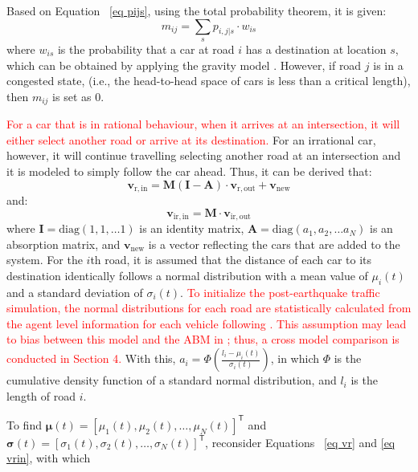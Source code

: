 \documentclass[review,11pt,nonatbib]{elsarticle}
\begin{document}
Based on Equation ~\eqref{eq pijs}, using the total probability theorem, it is given:
\begin{equation}\label{eq mij}
m_{ij}=\sum_{s} p_{i,j|s}\cdot w_{is}
\end{equation}
where $w_{is}$ is the probability that a car at road $i$ has a destination at location $s$, which can be obtained by applying the gravity model \citep{moriarty2007modeling,chang2012post}. However, if road $j$ is in a congested state, (i.e., the head-to-head space of cars is less than a critical length), then $m_{ij}$ is set as 0.
\par \textcolor{red}{For a car that is in rational behaviour, when it arrives at an intersection, it will either select another road or arrive at its destination.} For an irrational car, however, it will continue travelling selecting another road at an intersection and it is modeled to simply follow the car ahead. Thus, it can be derived that:
\begin{equation}\label{eq vrin}
\mathbf{v}_{\mathrm{r,in}} = \mathbf{M}(\mathbf{I}-\mathbf{A})\cdot \mathbf{v}_{\mathrm{r,out}} + \mathbf{v}_{\mathrm{new}}
\end{equation}
and:
\begin{equation}\label{eq virin}
\mathbf{v}_{\mathrm{ir,in}} = \mathbf{M}\cdot \mathbf{v}_{\mathrm{ir,out}}
\end{equation}
where $\mathbf{I}=\mathrm{diag}(1,1,\ldots 1)$ is an identity matrix, $\mathbf{A}=\mathrm{diag}(a_1,a_2,\ldots a_N)$ is an absorption matrix, and $\mathbf{v}_{\mathrm{new}}$ is a vector reflecting the cars that are added to the system. For the $i$th road, it is assumed that the distance of each car to its destination identically follows a normal distribution with a mean value of $\mu_i(t)$ and a standard deviation of $\sigma_i(t)$. \textcolor{red}{To initialize the post-earthquake traffic simulation, the normal distributions for each road are statistically calculated from the agent level information for each vehicle following \citet{feng2017post}. This assumption may lead to bias between this model and the ABM in \citet{feng2017post}; thus, a cross model comparison is conducted in Section 4.} With this, $a_i=\Phi\left(\frac{l_i-\mu_i(t)}{\sigma_i(t)}\right)$, in which $\Phi$ is the cumulative density function of a standard normal distribution, and $l_i$ is the length of road $i$.
\par To find ${\bm{\mu}}(t)=[\mu_1(t),\mu_2(t),\ldots,\mu_N(t)]^{\mathsf{T}}$ and ${\bm{\sigma}}(t)=[\sigma_1(t),\sigma_2(t),\ldots,\sigma_N(t)]^{\mathsf{T}}$, reconsider Equations ~\eqref{eq vr} and \eqref{eq vrin}, with which
\end{document}
